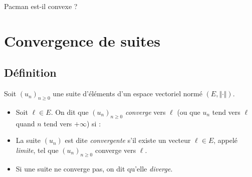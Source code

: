 \documentclass[french,11pt,twoside]{VcCours}
\begin{document}
\vspace*{6cm}
%

\begin{ApplicationDirecte}{} Pacman est-il convexe ?
\end{ApplicationDirecte} 

\section{Convergence de suites}
\subsection{Définition}
\begin{Definition}{} Soit $(u_n)_{n \geq 0}$ une suite d'éléments d'un espace vectoriel normé $(E, \Vert \cdot \Vert)$.

\begin{itemize}
\item Soit $\ell \in E$. On dit que $(u_n)_{ n\geq 0}$ \emph{converge} vers $\ell$ (ou que $u_n$ tend vers $\ell$ quand $n$ tend vers $+ \infty$) si :

\vspace*{1cm}

\item La suite $(u_n)$ est dite \emph{convergente} s'il existe un vecteur $\ell \in E$, appelé \emph{limite}, tel que $(u_n)_{n \geq 0}$ converge vers $\ell$.
\item Si une suite ne converge pas, on dit qu'elle \emph{diverge}.
\end{itemize}
\end{Definition}
\end{document}
